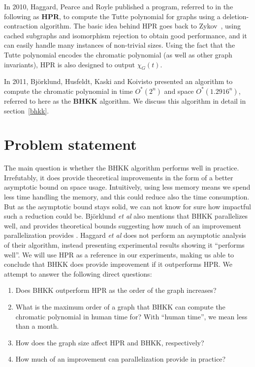 \documentclass{cslthse-msc}
\begin{document}
In 2010, Haggard, Pearce and Royle \cite{haggard} published a program, referred to in the following as \textbf{HPR}, to compute the Tutte polynomial for graphs using a deletion-contraction algorithm. The basic idea behind HPR goes back to Zykov~\cite{aazykov}, using cached subgraphs and isomorphism rejection to obtain good performance, and it can easily handle many instances of non-trivial sizes. Using the fact that the Tutte polynomial encodes the chromatic polynomial (as well as other graph invariants), HPR is also designed to output $\chi_G(t)$.

In 2011, Björklund, Husfeldt, Kaski and Koivisto \cite{cov_pack} presented an algorithm to compute the chromatic polynomial in time $O^*(2^n)$ and space $O^*(1.2916^n)$, referred to here as the \textbf{BHKK} algorithm. We discuss this algorithm in detail in section~\ref{bhkk}.

\section{Problem statement}
The main question is whether the BHKK algorithm performs well in practice. Irrefutably, it does provide theoretical improvements in the form of a better asymptotic bound on space usage. Intuitively, using less memory means we spend less time handling the memory, and this could reduce also the time consumption. But as the asymptotic bound stays solid, we can not know for sure how impactful such a reduction could be. Björklund \emph{et al} also mentions that BHKK parallelizes well, and provides theoretical bounds suggesting how much of an improvement parallelization provides \cite[p.10]{cov_pack}. Haggard \emph{et al} does not perform an asymptotic analysis of their algorithm, instead presenting experimental results showing it ``performs well''. We will use HPR as a reference in our experiments, making us able to conclude that BHKK does provide improvement if it outperforms HPR. We attempt to answer the following direct questions:

\begin{enumerate}
 \item Does BHKK outperform HPR as the order of the graph increases? \label{ngrow}
 \item What is the maximum order of a graph that BHKK can compute the chromatic polynomial in human time for? \label{maxn}
 \subitem With ``human time'', we mean less than a month.
 \item How does the graph size affect HPR and BHKK, respectively? \label{mgrow}
 \item How much of an improvement can parallelization provide in practice? \label{parallel}
\end{enumerate}
\end{document}
